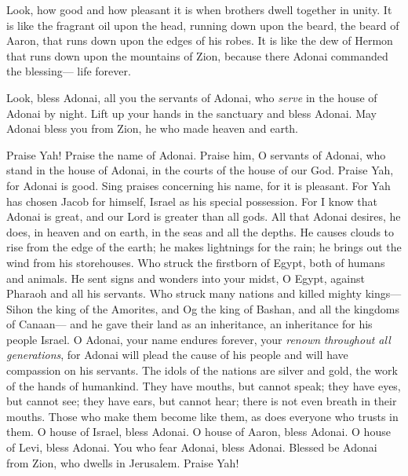 \begin{biblechapter} %
 Look, how good and how pleasant it is 
when brothers dwell together in unity.
\verse It is like the fragrant oil upon the head, 
running down upon the beard, the beard of Aaron, 
that runs down upon the edges of his robes.
\verse It is like the dew of Hermon that runs down 
upon the mountains of Zion, 
because there Adonai commanded the blessing— 
life forever.
\end{biblechapter}

\begin{biblechapter} %
 Look, bless Adonai, all you the servants of Adonai, 
who \textit{serve} in the house of Adonai by night.
\verse Lift up your hands in the sanctuary 
and bless Adonai.
\verse May Adonai bless you from Zion, 
he who made heaven and earth.
\end{biblechapter}

\begin{biblechapter} %
 Praise Yah! Praise the name of Adonai. 
Praise him, O servants of Adonai,
\verse who stand in the house of Adonai, 
in the courts of the house of our God.
\verse Praise Yah, for Adonai is good. 
Sing praises concerning his name, for it is pleasant.
\verse For Yah has chosen Jacob for himself, 
Israel as his special possession.
\verse For I know that Adonai is great, 
and our Lord is greater than all gods.
\verse All that Adonai desires, he does, 
in heaven and on earth, 
in the seas and all the depths.
\verse He causes clouds to rise from the edge of the earth; 
he makes lightnings for the rain; 
he brings out the wind from his storehouses.
\verse Who struck the firstborn of Egypt, 
both of humans and animals.
\verse He sent signs and wonders into your midst, O Egypt, 
against Pharaoh and all his servants.
\verse Who struck many nations 
and killed mighty kings—
\verse Sihon the king of the Amorites, 
and Og the king of Bashan, 
and all the kingdoms of Canaan—
\verse and he gave their land as an inheritance, 
an inheritance for his people Israel.
\verse O Adonai, your name endures forever, 
your \textit{renown} \textit{throughout all generations},
\verse for Adonai will plead the cause of his people 
and will have compassion on his servants.
\verse The idols of the nations are silver and gold, 
the work of the hands of humankind.
\verse They have mouths, but cannot speak; 
they have eyes, but cannot see;
\verse they have ears, but cannot hear; 
there is not even breath in their mouths.
\verse Those who make them become like them, 
as does everyone who trusts in them.
\verse O house of Israel, bless Adonai. 
O house of Aaron, bless Adonai.
\verse O house of Levi, bless Adonai. 
You who fear Adonai, bless Adonai.
\verse Blessed be Adonai from Zion, 
who dwells in Jerusalem. Praise Yah!
\end{biblechapter}

